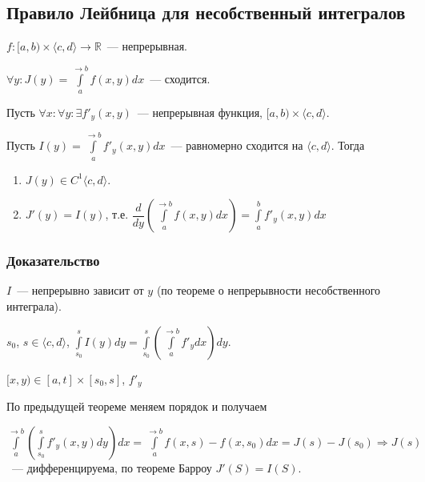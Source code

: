 \documentclass{article}
\begin{document}
    \subsection{Правило Лейбница для несобственный интегралов}
    
        $f : [a, b) \times \langle c, d \rangle \rightarrow \mathbb{R}$~--- непрерывная.
        
        $\forall y : J(y) = \int\limits^{\rightarrow b}_a f(x, y) dx$~--- сходится.
        
        Пусть $\forall x : \forall y : \exists f'_y(x, y)$~--- непрерывная функция, $[a, b) \times \langle c, d \rangle$.
        
        Пусть $I(y) = \int\limits^{\rightarrow b}_a f'_y (x, y) dx$~--- равномерно сходится на $\langle c, d \rangle$. Тогда 
        
        \begin{enumerate}
        
            \item $J(y) \in C^1 \langle c, d \rangle$.
        
            \item $J'(y) = I(y)$, т.е. $\dfrac{d}{dy} \left( \int\limits^{\rightarrow b}_a f(x, y) dx \right) = \int\limits^b_a f'_y(x, y) dx$
            
        \end{enumerate}
        
        \subsubsection{Доказательство}
        
            $I$~--- непрерывно зависит от $y$ (по теореме о непрерывности несобственного интеграла).
            
            $s_0$, $s \in \langle c, d \rangle$, $\int\limits^s_{s_0} I(y) dy = \int\limits^s_{s_0} \left( \int\limits^{\rightarrow b}_a f'_y dx \right) dy$.
            
            $[x, y) \in [a, t] \times [s_0, s]$, $f'_y$
            
            По предыдущей теореме меняем порядок и получаем
            
            $\int\limits^{\rightarrow b}_a \left( \int\limits^s_{s_0} f'_y(x, y) dy \right) dx = \int\limits^{\rightarrow b}_a f(x, s) - f(x, s_0) dx = J(s) - J(s_0) \Rightarrow J(s)$~--- дифференцируема, по теореме Барроу $J'(S) = I(S)$.
            
\end{document}
